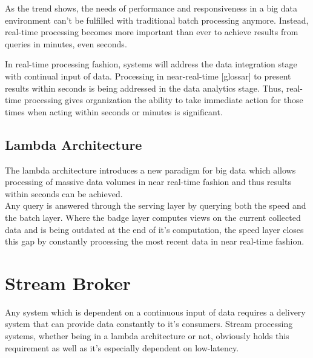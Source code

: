 As the trend shows, the needs of performance and responsiveness in a big data environment can't be fulfilled with 
traditional batch processing anymore. Instead, real-time processing becomes more 
important than ever to achieve results from queries in minutes, even seconds. 
\cite{bange2013big}


In real-time processing fashion, systems will address the data integration stage
with continual input of data. Processing in near-real-time [glossar] to present 
results within seconds is being addressed in the data analytics stage. Thus,
real-time processing gives organization the ability to take immediate action
for those times when acting within seconds or minutes is significant.
\cite{PrpSvyOfDSPS}



\subsection{Lambda Architecture}
The lambda architecture introduces a new paradigm for big data which allows
processing of massive data volumes in near real-time fashion and thus results within
seconds can be achieved. 
\\
Any query is answered through the serving layer by querying 
both the speed and the batch layer. Where the badge layer computes views on the current collected data and
is being outdated at the end of it's computation, the speed layer closes this 
gap by constantly processing the most recent data in near real-time fashion. 
\cite{marz2015big} \cite{PrpSvyOfDSPS}

\section{Stream Broker}
Any system which is dependent on a continuous input of data requires a delivery
system that can provide data constantly to it's consumers. Stream processing
systems, whether being in a lambda architecture or not, obviously holds this requirement
as well as it's especially dependent on low-latency.


